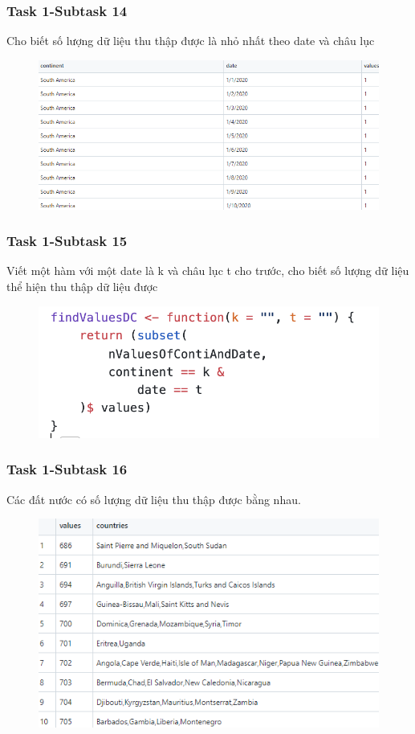 \documentclass[english,10pt,table]{beamer}
\begin{document}
\frame
{
    \frametitle{Task 1-Subtask 14}
    \begin{block}{Cho biết số lượng dữ liệu thu thập được là nhỏ nhất theo date và châu lục}
    \begin{figure}[H]
				\centering
				\includegraphics[scale=0.45]{images/1.14.png}
			\end{figure}
    \end{block}
}
\frame
{
    \frametitle{Task 1-Subtask 15}
    \begin{block}{Viết một hàm với một date là k và châu lục t cho trước, cho biết số lượng dữ liệu thể hiện thu thập dữ liệu được}
    \begin{figure}[H]
				\centering
				\includegraphics[scale=0.45]{images/1.18.png}
			\end{figure}
    \end{block}
}
\frame
{
    \frametitle{Task 1-Subtask 16}
    \begin{block}{Các đất nước có số lượng dữ liệu thu thập được bằng nhau.}
    \begin{figure}[H]
				\centering
				\includegraphics[scale=0.6]{images/1.15.png}
			\end{figure}
    \end{block}
}
\end{document}
